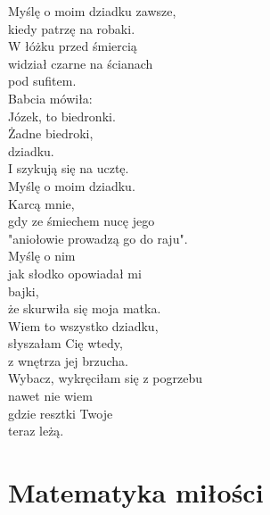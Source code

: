 \documentclass[12pt, a4paper]{memoir}
\renewenvironment{verse}{%
  \par\vspace{\baselineskip}\raggedright
}{
  \par\vspace{\baselineskip}
}
\begin{document}
\begin{verse}
Myślę o moim dziadku zawsze,\\
kiedy patrzę na robaki.\\[\baselineskip]

W łóżku przed śmiercią\\
widział czarne na ścianach\\
pod sufitem.\\
Babcia mówiła:\\
Józek, to biedronki.\\[\baselineskip]

Żadne biedroki,\\
dziadku.\\
I szykują się na ucztę.\\[\baselineskip]

Myślę o moim dziadku.\\
Karcą mnie,\\
gdy ze śmiechem nucę jego\\
"aniołowie prowadzą go do raju".\\[\baselineskip]

Myślę o nim\\
jak słodko opowiadał mi\\
bajki,\\
że skurwiła się moja matka.\\
Wiem to wszystko dziadku,\\
słyszałam Cię wtedy,\\
z wnętrza jej brzucha.\\[\baselineskip]

Wybacz, wykręciłam się z pogrzebu\\
nawet nie wiem\\
gdzie resztki Twoje\\
teraz leżą.\\
\end{verse}
\clearpage

\part{Matematyka miłości}
\end{document}
